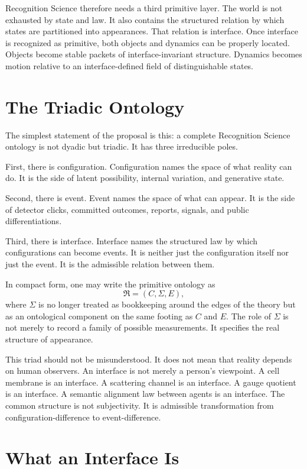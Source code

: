 \documentclass[11pt]{article}
\begin{document}
Recognition Science therefore needs a third primitive layer.
The world is not exhausted by state and law.
It also contains the structured relation by which states are partitioned into appearances.
That relation is interface.
Once interface is recognized as primitive, both objects and dynamics can be properly located.
Objects become stable packets of interface-invariant structure.
Dynamics becomes motion relative to an interface-defined field of distinguishable states.

\section{The Triadic Ontology}

The simplest statement of the proposal is this: a complete Recognition Science ontology is not dyadic but triadic.
It has three irreducible poles.

First, there is configuration.
Configuration names the space of what reality can do.
It is the side of latent possibility, internal variation, and generative state.

Second, there is event.
Event names the space of what can appear.
It is the side of detector clicks, committed outcomes, reports, signals, and public differentiations.

Third, there is interface.
Interface names the structured law by which configurations can become events.
It is neither just the configuration itself nor just the event.
It is the admissible relation between them.

In compact form, one may write the primitive ontology as
\[
\mathfrak{R} = (C,\Sigma,E),
\]
where $\Sigma$ is no longer treated as bookkeeping around the edges of the theory but as an ontological component on the same footing as $C$ and $E$.
The role of $\Sigma$ is not merely to record a family of possible measurements.
It specifies the real structure of appearance.

This triad should not be misunderstood.
It does not mean that reality depends on human observers.
An interface is not merely a person's viewpoint.
A cell membrane is an interface.
A scattering channel is an interface.
A gauge quotient is an interface.
A semantic alignment law between agents is an interface.
The common structure is not subjectivity.
It is admissible transformation from configuration-difference to event-difference.

\section{What an Interface Is}
\end{document}
